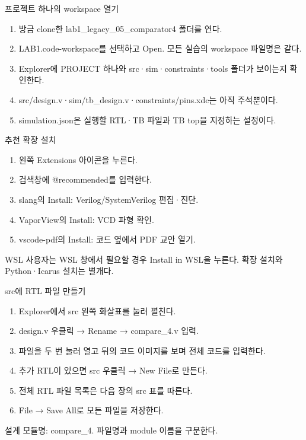 \begin{frame}{프로젝트 하나의 workspace 열기}\relax
\small
\begin{enumerate}\setlength{\itemsep}{0.22cm}
\item 방금 clone한 lab1\_legacy\_05\_comparator4 폴더를 연다.
\item LAB1.code-workspace를 선택하고 Open. 모든 실습의 workspace 파일명은 같다.
\item Explorer에 PROJECT 하나와 src·sim·constraints·tools 폴더가 보이는지 확인한다.
\item src/design.v·sim/tb\_design.v·constraints/pins.xdc는 아직 주석뿐이다.
\item simulation.json은 실행할 RTL·TB 파일과 TB top을 지정하는 설정이다.
\end{enumerate}

\end{frame}

\begin{frame}{추천 확장 설치}\relax
\small
\begin{enumerate}\setlength{\itemsep}{0.22cm}
\item 왼쪽 Extensions 아이콘을 누른다.
\item 검색창에 @recommended를 입력한다.
\item slang의 Install: Verilog/SystemVerilog 편집·진단.
\item VaporView의 Install: VCD 파형 확인.
\item vscode-pdf의 Install: 코드 옆에서 PDF 교안 열기.
\end{enumerate}
WSL 사용자는 WSL 창에서 필요할 경우 Install in WSL을 누른다. 확장 설치와 Python·Icarus 설치는 별개다.\par
\end{frame}

\begin{frame}{src에 RTL 파일 만들기}\relax
\small
\begin{enumerate}\setlength{\itemsep}{0.22cm}
\item Explorer에서 src 왼쪽 화살표를 눌러 펼친다.
\item design.v 우클릭 → Rename → compare\_4.v 입력.
\item 파일을 두 번 눌러 열고 뒤의 코드 이미지를 보며 전체 코드를 입력한다.
\item 추가 RTL이 있으면 src 우클릭 → New File로 만든다.
\item 전체 RTL 파일 목록은 다음 장의 src 표를 따른다.
\item File → Save All로 모든 파일을 저장한다.
\end{enumerate}
설계 모듈명: compare\_4. 파일명과 module 이름을 구분한다.\par
\end{frame}

